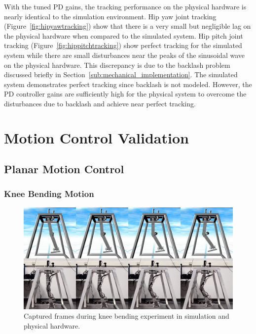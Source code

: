 
With the tuned PD gains, the tracking performance on the physical hardware is nearly identical to the simulation environment. Hip yaw joint tracking (Figure~\ref{fig:hipyawtracking}) show that there is a very small but negligible lag on the physical hardware when compared to the simulated system. Hip pitch joint tracking (Figure~\ref{fig:hippitchtracking}) show perfect tracking for the simulated system while there are small disturbances near the peaks of the sinusoidal wave on the physical hardware. This discrepancy is due to the backlash problem discussed briefly in Section~\ref{sub:mechanical_implementation}. The simulated system demonstrates perfect tracking since backlash is not modeled. However, the PD controller gains are sufficiently high for the physical system to overcome the disturbances due to backlash and achieve near perfect tracking. 



\section{Motion Control Validation} %
\label{sec:motion_control_validation}
\Incomplete

\subsection{Planar Motion Control} %
\label{sub:planar_motion_control}

\subsubsection{Knee Bending Motion} %
\label{ssub:knee_bending_motion}
\begin{figure}[!h]
	\centering
    \includegraphics[scale=0.22]{fig/experiments/kneebendframes.png} 
  	\caption{Captured frames during knee bending experiment in simulation and physical hardware.}
	\label{fig:kneebendframes}
\end{figure}

